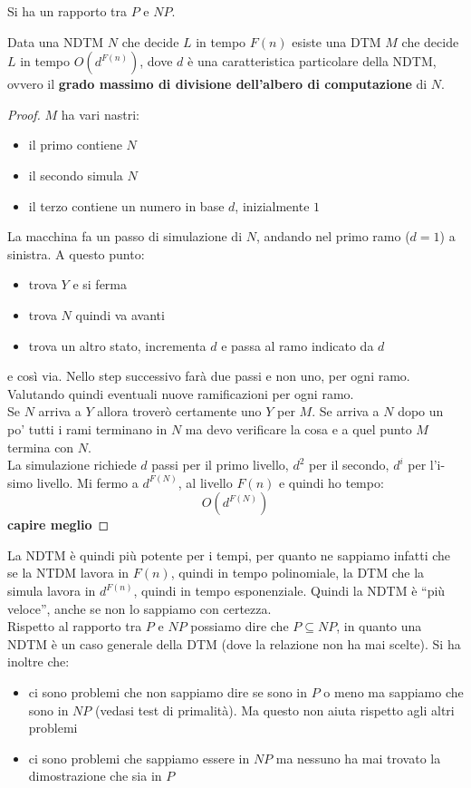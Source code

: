 Si ha un rapporto tra $P$ e $NP$.
\begin{teorema}
  Data una NDTM $N$ che decide $L$ in tempo $F(n)$ esiste una DTM $M$ che decide
  $L$ in tempo $O(d^{F(n)})$, dove $d$ è una caratteristica particolare della
  NDTM, ovvero il \textbf{grado massimo di divisione dell'albero di
    computazione} di $N$. 
\end{teorema}
\begin{proof}
  $M$ ha vari nastri:
  \begin{itemize}
    \item il primo contiene $N$
    \item il secondo simula $N$
    \item il terzo contiene un numero in base $d$, inizialmente $1$
  \end{itemize}
  La macchina fa un passo di simulazione di $N$, andando nel primo ramo ($d=1$)
  a sinistra. A questo punto:
  \begin{itemize}
    \item trova $Y$ e si ferma
    \item trova $N$ quindi va avanti
    \item trova un altro stato, incrementa $d$ e passa al ramo indicato da
    $d$
  \end{itemize}
  e così via. Nello step successivo farà due passi e non uno, per ogni
  ramo. Valutando quindi eventuali nuove ramificazioni per ogni ramo. \\
  Se $N$ arriva a $Y$ allora troverò certamente uno $Y$ per $M$. Se arriva a $N$
  dopo un po' tutti i rami terminano in $N$ ma devo verificare la cosa e a quel
  punto $M$ termina con $N$.\\
  La simulazione richiede $d$ passi per il primo livello, $d^2$ per il secondo,
  $d^i$ per l'i-simo livello. Mi fermo a $d^{F(N)}$, al livello $F(n)$ e quindi
  ho tempo: 
  \[O(d^{F(N)})\]
  \textbf{capire meglio}
\end{proof}
La NDTM è quindi più potente per i tempi, per quanto ne sappiamo infatti che se
la NTDM lavora in $F(n)$, quindi in tempo polinomiale, la DTM che la simula
lavora in $d^{F(n)}$, quindi in tempo esponenziale. Quindi la NDTM è ``più
veloce'', anche se non lo sappiamo con certezza.\\
Rispetto al rapporto tra $P$ e $NP$ possiamo dire che $P\subseteq NP$, in quanto
una NDTM è un caso generale della DTM (dove la relazione non ha mai scelte). Si
ha inoltre che: 
\begin{itemize}
  \item ci sono problemi che non sappiamo dire se sono in $P$ o meno ma sappiamo
  che sono in $NP$ (vedasi test di primalità). Ma questo non aiuta rispetto agli
  altri problemi
  \item ci sono problemi che sappiamo essere in $NP$ ma nessuno ha mai trovato
  la dimostrazione che sia in $P$
\end{itemize}
